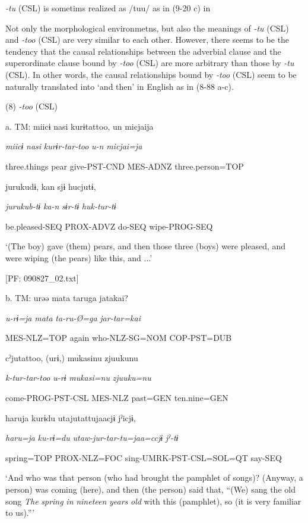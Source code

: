 \textit{{}-tu} (CSL) is sometims realized as /tuu/ as in (9-20 c) in 

Not only the morphological environmetns, but also the meanings of \textit{{}-tu} (CSL) and \textit{{}-too} (CSL) are very similar to each other. However, there seems to be the tendency that the causal relationships between the adverbial clause and the superordinate clause bound by \textit{-too} (CSL) are more arbitrary than those by \textit{{}-tu} (CSL). In other words, the causal relationships bound by \textit{{}-too} (CSL) seem to be naturally translated into ‘and then’ in English as in (8-88 a-c).

(8)  \textit{{}-too} (CSL)

  a.  TM:  miicɨ  nasi  kurɨtattoo,  un  micjaija

      \textit{miicɨ}  \textit{nasi}  \textit{kurɨr-tar-too}  \textit{u-n}  \textit{micjai=ja}

      three.things  pear  give-PST-CND  MES-ADNZ  three.person=TOP

      jurukudɨ,  kan  sjɨ  hucjutɨ,

      \textit{jurukub-tɨ}  \textit{ka-n}  \textit{sɨr-tɨ}  \textit{huk-tur-tɨ}

      be.pleased-SEQ  PROX-ADVZ  do-SEQ  wipe-PROG-SEQ

      ‘(The boy) gave (them) pears, and then those three (boys) were pleased, and were wiping (the pears) like this, and ...’

      [PF: 090827\_02.txt]

  b.  TM:  urəə  mata  taruga  jatakai?

      \textit{u-rɨ=ja}  \textit{mata}  \textit{ta-ru-Ø=ga}  \textit{jar-tar=kai}

      MES-NLZ=TOP  again  who-NLZ-SG=NOM  COP-PST=DUB

      cˀjutattoo,  (urɨ,)  mukasinu  {\textbar}zjuukunu

      \textit{k-tur-tar-too}  \textit{u-rɨ}  \textit{mukasi=nu}  \textit{zjuuku=nu}

      come-PROG-PST-CSL  MES-NLZ  past=GEN  ten.nine=GEN

      haru{\textbar}ja  kurɨdu  utajutattujaacjɨ  jˀicjɨ,

      \textit{haru=ja}  \textit{ku-rɨ=du}  \textit{utaw-jur-tar-tu=jaa=ccjɨ}  \textit{jˀ-tɨ}

      spring=TOP  PROX-NLZ=FOC  sing-UMRK-PST-CSL=SOL=QT  say-SEQ

      ‘And who was that person (who had brought the pamphlet of songs)? (Anyway, a person) was coming (here), and then (the person) said that, “(We) sang the old song \textit{The} \textit{spring} \textit{in} \textit{nineteen} \textit{years} \textit{old} with this (pamphlet), so (it is very familiar to us).”’

